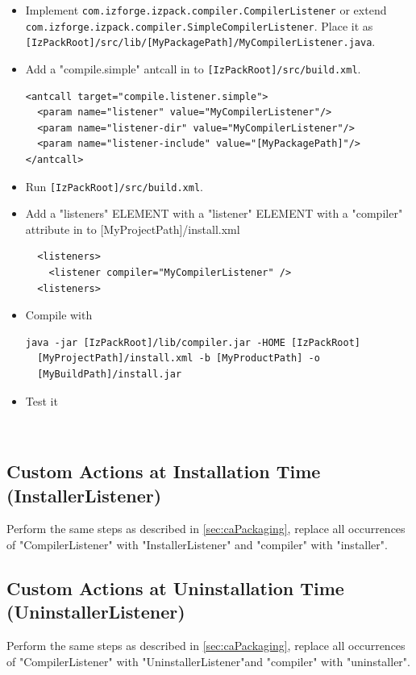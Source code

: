 \begin{itemize}
  \item Implement \texttt{com.izforge.izpack.compiler.CompilerListener} or
  extend \texttt{com.izforge.izpack.compiler.SimpleCompilerListener}.
  Place it as \texttt{[IzPackRoot]/src/lib/[MyPackagePath]/MyCompilerListener.java}.

  \item Add a "compile.simple" antcall in to \texttt{[IzPackRoot]/src/build.xml}.
\footnotesize
\begin{verbatim}
<antcall target="compile.listener.simple">
  <param name="listener" value="MyCompilerListener"/>
  <param name="listener-dir" value="MyCompilerListener"/>
  <param name="listener-include" value="[MyPackagePath]"/>
</antcall>
\end{verbatim}
\normalsize

  \item Run \texttt{[IzPackRoot]/src/build.xml}.

  \item Add a "listeners" ELEMENT with a "listener" ELEMENT with
  a "compiler" attribute in to [MyProjectPath]/install.xml
\footnotesize
\begin{verbatim}
  <listeners>
    <listener compiler="MyCompilerListener" />
  <listeners>
\end{verbatim}
\normalsize

  \item Compile with
\footnotesize
\begin{verbatim}
java -jar [IzPackRoot]/lib/compiler.jar -HOME [IzPackRoot]
  [MyProjectPath]/install.xml -b [MyProductPath] -o
  [MyBuildPath]/install.jar
\end{verbatim}
\normalsize

  \item Test it
\end{itemize}\

\subsection{Custom Actions at Installation Time (InstallerListener)}
Perform the same steps as described in \ref{sec:caPackaging}, replace
all occurrences of "CompilerListener" with "InstallerListener" and
"compiler" with "installer".

\subsection{Custom Actions at Uninstallation Time
(UninstallerListener)} Perform the same steps as described in
\ref{sec:caPackaging}, replace all occurrences of
"CompilerListener" with "UninstallerListener"and "compiler" with
"uninstaller".

